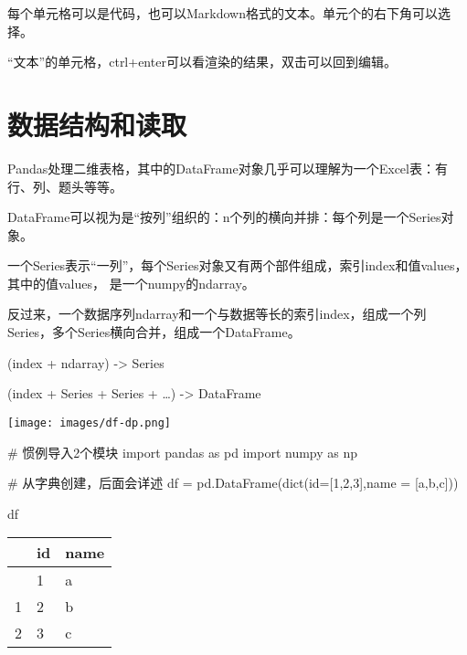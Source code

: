\documentclass[
  letterpaper,
  DIV=11,
  numbers=noendperiod]{scrreprt}
\newenvironment{Shaded}{\begin{snugshade}}{\end{snugshade}}
\newcommand{\BuiltInTok}[1]{\textcolor[rgb]{0.00,0.23,0.31}{#1}}
\newcommand{\CommentTok}[1]{\textcolor[rgb]{0.37,0.37,0.37}{#1}}
\newcommand{\DecValTok}[1]{\textcolor[rgb]{0.68,0.00,0.00}{#1}}
\newcommand{\ImportTok}[1]{\textcolor[rgb]{0.00,0.46,0.62}{#1}}
\newcommand{\NormalTok}[1]{\textcolor[rgb]{0.00,0.23,0.31}{#1}}
\newcommand{\OperatorTok}[1]{\textcolor[rgb]{0.37,0.37,0.37}{#1}}
\newcommand{\StringTok}[1]{\textcolor[rgb]{0.13,0.47,0.30}{#1}}
\begin{document}
每个单元格可以是代码，也可以Markdown格式的文本。单元个的右下角可以选择。

``文本''的单元格，ctrl+enter可以看渲染的结果，双击可以回到编辑。

\hypertarget{ux6570ux636eux7ed3ux6784ux548cux8bfbux53d6}{%
\section{数据结构和读取}\label{ux6570ux636eux7ed3ux6784ux548cux8bfbux53d6}}

Pandas处理二维表格，其中的DataFrame对象几乎可以理解为一个Excel表：有行、列、题头等等。

DataFrame可以视为是``按列''组织的：n个列的横向并排：每个列是一个Series对象。

一个Series表示``一列''，每个Series对象又有两个部件组成，索引index和值values，其中的值values，
是一个numpy的ndarray。

反过来，一个数据序列ndarray和一个与数据等长的索引index，组成一个列Series，多个Series横向合并，组成一个DataFrame。

(index + ndarray) -\textgreater{} Series

(index + Series + Series + \ldots) -\textgreater{} DataFrame

\texttt{[image: images/df-dp.png]}

\begin{Shaded}
\begin{Highlighting}[]
\CommentTok{\# 惯例导入2个模块}
\ImportTok{import}\NormalTok{ pandas }\ImportTok{as}\NormalTok{ pd}
\ImportTok{import}\NormalTok{ numpy }\ImportTok{as}\NormalTok{ np}

\CommentTok{\# 从字典创建，后面会详述}
\NormalTok{df }\OperatorTok{=}\NormalTok{ pd.DataFrame(}\BuiltInTok{dict}\NormalTok{(}\BuiltInTok{id}\OperatorTok{=}\NormalTok{[}\DecValTok{1}\NormalTok{,}\DecValTok{2}\NormalTok{,}\DecValTok{3}\NormalTok{],name }\OperatorTok{=}\NormalTok{ [}\StringTok{\textquotesingle{}a\textquotesingle{}}\NormalTok{,}\StringTok{\textquotesingle{}b\textquotesingle{}}\NormalTok{,}\StringTok{\textquotesingle{}c\textquotesingle{}}\NormalTok{]))}

\NormalTok{df}
\end{Highlighting}
\end{Shaded}

\begin{longtable}[]{@{}lll@{}}
\toprule\noalign{}
& id & name \\
\midrule\noalign{}
\endhead
\bottomrule\noalign{}
\endlastfoot
0 & 1 & a \\
1 & 2 & b \\
2 & 3 & c \\
\end{longtable}
\end{document}
